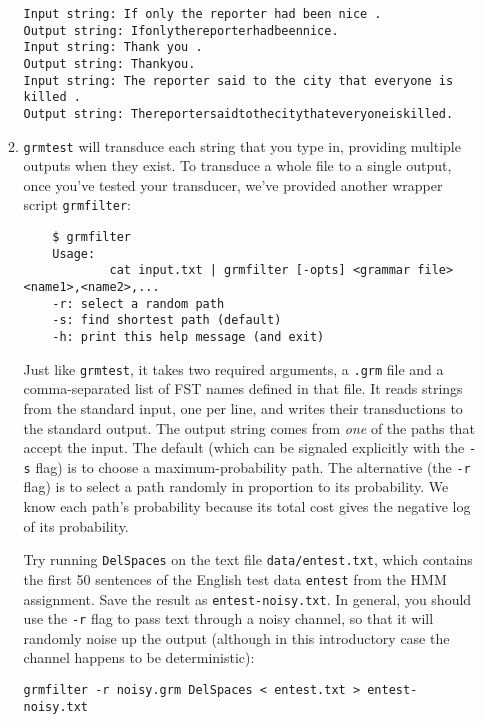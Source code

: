\documentclass[11pt]{article}
\newcommand{\Note}[1]{}
\newcommand{\NoteSigned}[3]{{\sethlcolor{#2}\Note{#1: #3}}}
\newcommand{\NoteJE}[1]{\NoteSigned{JE}{YellowGreen}{#1}}
\begin{document}
\begin{enumerate}[resume]
\begin{enumerate}
\begin{verbatim}
Input string: If only the reporter had been nice .
Output string: Ifonlythereporterhadbeennice.
Input string: Thank you .
Output string: Thankyou.
Input string: The reporter said to the city that everyone is killed .
Output string: Thereportersaidtothecitythateveryoneiskilled.
\end{verbatim}

  \item \texttt{grmtest} will transduce each string that you type in,
    providing multiple outputs when they exist.
    To transduce a whole file to a single output, once you've tested
    your transducer, we've provided another wrapper script
    \texttt{grmfilter}:\NoteJE{maybe not necessary to give the full
      doc output}

    	\begin{verbatim}
	$ grmfilter
	Usage:
	        cat input.txt | grmfilter [-opts] <grammar file> <name1>,<name2>,...
	-r: select a random path
	-s: find shortest path (default)
	-h: print this help message (and exit)
	\end{verbatim}

    Just like {\tt grmtest}, it takes two required arguments, a {\tt .grm}
    file and a comma-separated list of FST names defined in that file.
    It reads strings from the standard input, one per line, and writes
    their transductions to the standard output.  The output string
    comes from {\em one} of the paths that accept the
    input.\NoteJE{what do we do if there are no outputs?} The default
    (which can be signaled explicitly with the {\tt -s} flag) is to
    choose a maximum-probability path.  The alternative (the {\tt -r}
    flag) is to select a path randomly in proportion to its
    probability.  We know each path's probability because its total
    cost gives the negative log of its probability.

    Try running \texttt{DelSpaces} on the text file
    \texttt{data/entest.txt}, which contains the first 50 sentences of
    the English test data \texttt{entest} from the HMM assignment.
    Save the result as \texttt{entest-noisy.txt}.  In general, you
    should use the {\tt -r} flag to pass text through a noisy channel,
    so that it will randomly noise up the output (although in this
    introductory case the channel happens to be deterministic):

\begin{verbatim}
grmfilter -r noisy.grm DelSpaces < entest.txt > entest-noisy.txt
\end{verbatim}


\end{enumerate}
\end{enumerate}
\end{document}
